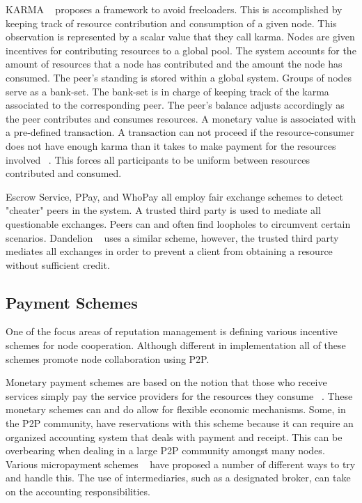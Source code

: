 \documentclass[%
				10pt,
        final,
        notitlepage,
        narroweqnarray,
        inline,
        twoside,
        ]{ieee}
\begin{document}
KARMA ~\cite{vishnumurthy} proposes a framework to avoid freeloaders.  This is accomplished by keeping track of resource contribution and consumption of a given node.  This observation is represented by a scalar value that they call karma.  Nodes are given incentives for contributing resources to a global pool.  The system accounts for the amount of resources that a node has contributed and the amount the node has consumed.  The peer's standing is stored within a global system.  Groups of nodes serve as a bank-set.  The bank-set is in charge of keeping track of the karma associated to the corresponding peer.  The peer's balance adjusts accordingly as the peer contributes and consumes resources.  A monetary value is associated with a pre-defined transaction.  A transaction can not proceed if the resource-consumer does not have enough karma than it takes to make payment for the resources involved ~\cite{vishnumurthy}.  This forces all participants to be uniform between resources contributed and consumed.  

Escrow Service, PPay, and WhoPay all employ fair exchange schemes to detect "cheater" peers in the system.  A trusted third party is used to mediate all questionable exchanges.  Peers can and often find loopholes to circumvent certain scenarios.  Dandelion ~\cite{sirivianos} uses a similar scheme, however, the trusted third party mediates all exchanges in order to prevent a client from obtaining a resource without sufficient credit.

\subsection{Payment Schemes}
One of the focus areas of reputation management is defining various incentive schemes for node cooperation.  Although different in implementation all of these schemes promote node collaboration using P2P.

Monetary payment schemes are based on the notion that those who receive services simply pay the service providers for the resources they consume ~\cite{feldman}.  These monetary schemes can and do allow for flexible economic mechanisms.  Some, in the P2P community, have reservations with this scheme because it can require an organized accounting system that deals with payment and receipt.  This can be overbearing when dealing in a large P2P community amongst many nodes.  Various micropayment schemes ~\cite{vishnumurthy} have proposed a number of different ways to try and handle this.  The use of intermediaries, such as a designated broker, can take on the accounting responsibilities.
\end{document}
